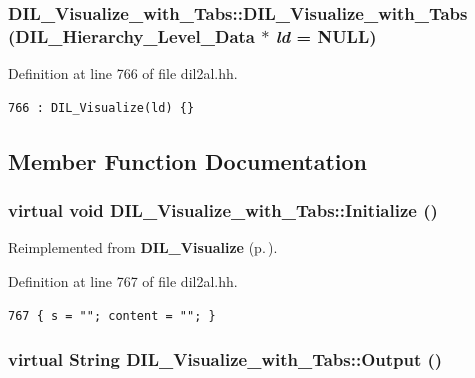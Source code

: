 \subsubsection{\setlength{\rightskip}{0pt plus 5cm}DIL\_\-Visualize\_\-with\_\-Tabs::DIL\_\-Visualize\_\-with\_\-Tabs ({\bf DIL\_\-Hierarchy\_\-Level\_\-Data} $\ast$ {\em ld} = NULL)\hspace{0.3cm}{\tt  [inline]}}\label{classDIL__Visualize__with__Tabs_a0}




Definition at line 766 of file dil2al.hh.



\footnotesize\begin{verbatim}766 : DIL_Visualize(ld) {}
\end{verbatim}\normalsize 


\subsection{Member Function Documentation}
\subsubsection{\setlength{\rightskip}{0pt plus 5cm}virtual void DIL\_\-Visualize\_\-with\_\-Tabs::Initialize ()\hspace{0.3cm}{\tt  [inline, virtual]}}\label{classDIL__Visualize__with__Tabs_a1}




Reimplemented from {\bf DIL\_\-Visualize} {\rm (p.\,\pageref{classDIL__Visualize_a1})}.

Definition at line 767 of file dil2al.hh.



\footnotesize\begin{verbatim}767 { s = ""; content = ""; }
\end{verbatim}\normalsize 
{}
\subsubsection{\setlength{\rightskip}{0pt plus 5cm}virtual {\bf String} DIL\_\-Visualize\_\-with\_\-Tabs::Output ()\hspace{0.3cm}{\tt  [inline, virtual]}}\label{classDIL__Visualize__with__Tabs_a4}




